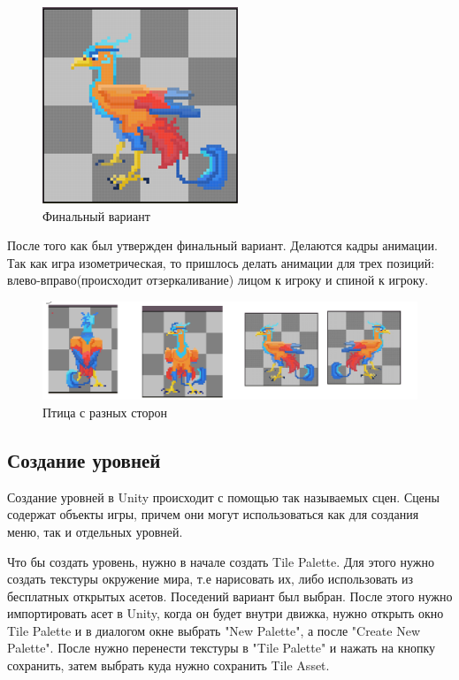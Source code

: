 \documentclass[bachelor, och, coursework, times]{SCWorks}
\begin{document}
     \begin{figure} [H]
        \centering
    \includegraphics[width=0.35\linewidth]{Pictures/Снимок экрана 2025-06-25 195944.png}
    \caption{Финальный вариант}
    \label{fig:firstSprite}
    \end{figure}

    После того как был утвержден финальный вариант. Делаются кадры анимации.
    Так как игра изометрическая, то пришлось делать анимации для трех позиций: влево-вправо(происходит
    отзеркаливание) лицом к игроку и спиной к игроку. 

     \begin{figure} [H]
        \centering
    \includegraphics[width=0.50\linewidth]{Pictures/Снимок экрана 2025-06-25 201224.png}
    \caption{Птица с разных сторон}
    \label{fig:Sprites}
    \end{figure}



    \subsection{Создание уровней}

    Создание уровней в Unity происходит с помощью так называемых сцен. Сцены содержат объекты игры,
    причем они могут использоваться как для создания меню, так и отдельных уровней.

    Что бы создать уровень, нужно в начале создать Tile Palette. Для этого нужно создать текстуры 
    окружение мира,
    т.е нарисовать их, либо использовать из бесплатных открытых асетов. Поседений вариант был выбран.
    После этого нужно импортировать асет в Unity, когда он будет внутри движка, нужно 
    открыть окно Tile Palette и в диалогом окне выбрать "New Palette", а после "Create New Palette".
    После нужно перенести текстуры в "Tile Palette" и нажать на кнопку сохранить, затем выбрать куда
    нужно сохранить Tile Asset\cite{search5}. 
\end{document}
